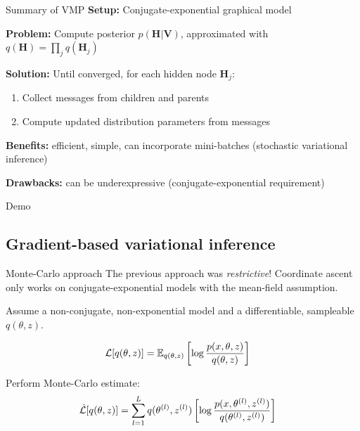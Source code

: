\documentclass[10pt, compress]{beamer}
\begin{document}
\begin{frame}{Summary of VMP}
	\textbf{Setup:} Conjugate-exponential graphical model

	\pause
	\textbf{Problem:} Compute posterior $p(\mathbf{H} | \mathbf{V})$, approximated with $q(\mathbf{H}) = \prod_j q(\mathbf{H}_j)$

	\pause
	\textbf{Solution:} Until converged, for each hidden node $\mathbf{H}_j$:
	\begin{enumerate}
			\pause
		\item Collect messages from children and parents
			\pause
		\item Compute updated distribution parameters from messages
	\end{enumerate}

	\pause
	\textbf{Benefits:} efficient, simple, can incorporate mini-batches (stochastic variational inference)

	\pause
	\textbf{Drawbacks:} can be underexpressive (conjugate-exponential requirement)
\end{frame}

\begin{frame}[standout]
Demo
\end{frame}

\subsection{Gradient-based variational inference}

\begin{frame}{Monte-Carlo approach}
  The previous approach was \emph{restrictive}! Coordinate ascent only
  works on conjugate-exponential models with the mean-field
  assumption.

  \pause

  Assume a non-conjugate, non-exponential model and a differentiable, sampleable
  $q(\theta, z)$.

  \pause

  \begin{align*}
    \mathcal{L}[q(\theta, z)] &= \mathbb{E}_{q(\theta, z)}\left[\log\frac{p(x, \theta, z)}{q(\theta, z)}\right]
  \end{align*}

  \pause

  Perform Monte-Carlo estimate:
  \begin{align*}
    \hat{\mathcal{L}}[q(\theta, z)] &= \sum_{l = 1}^L {q(\theta^{(l)}, z^{(l)})}\left[\log\frac{p(x, \theta^{(l)}, z^{(l)})}{q(\theta^{(l)}, z^{(l)})}\right]
  \end{align*}
\end{frame}
\end{document}
